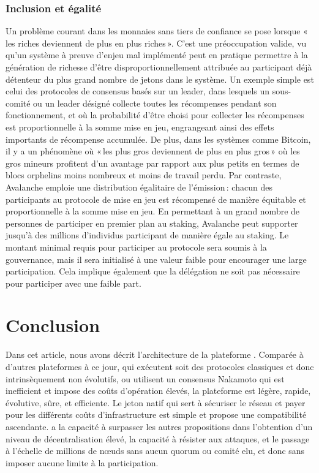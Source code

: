 \documentclass[runningheads,francais,a4paper]{llncs}
\begin{document}
\subsubsection{Inclusion et égalité}
Un problème courant dans les monnaies sans tiers de confiance se pose lorsque «\,les riches deviennent de plus en plus
riches\,». C'est une préoccupation valide, vu qu'un système à preuve d'enjeu mal implémenté peut en pratique permettre à
la génération de richesse d'être disproportionnellement attribuée au participant déjà détenteur du plus grand nombre de
jetons dans le système. Un exemple simple est celui des protocoles de consensus basés sur un leader, dans lesquels un
sous-comité ou un leader désigné collecte toutes les récompenses pendant son fonctionnement, et où la probabilité d'être
choisi pour collecter les récompenses est proportionnelle à la somme mise en jeu, engrangeant ainsi des effets
importants de récompense accumulée. De plus, dans les systèmes comme Bitcoin, il y a un phénomène où «\,les plus gros
deviennent de plus en plus gros\,» où les gros mineurs profitent d'un avantage par rapport aux plus petits en termes
de blocs orphelins moins nombreux et moins de travail perdu. Par contraste, Avalanche emploie une distribution
égalitaire de l'émission\,: chacun des participants au protocole de mise en jeu est récompensé de manière équitable et
proportionnelle à la somme mise en jeu. En permettant à un grand nombre de personnes de participer en premier plan
au staking, Avalanche peut supporter jusqu'à des millions d'individus participant de manière égale au staking. Le
montant minimal requis pour participer au protocole sera soumis à la gouvernance, mais il sera initialisé à une valeur
faible pour encourager une large participation. Cela implique également que la délégation ne soit pas nécessaire pour
participer avec une faible part.

\section{Conclusion}
\label{section:conclusion}
Dans cet article, nous avons décrit l'architecture de la plateforme \AVAPlatformName{}. Comparée à d'autres plateformes à
ce jour, qui exécutent soit des protocoles classiques et donc intrinsèquement non évolutifs, ou utilisent un consensus
Nakamoto qui est inefficient et impose des coûts d'opération élevés, la plateforme \AVAPlatformName{} est légère, rapide,
évolutive, sûre, et efficiente. Le jeton natif qui sert à sécuriser le réseau et payer pour les différents coûts
d'infrastructure est simple et propose une compatibilité ascendante. \AVATokenName{} a la capacité à surpasser les
autres propositions dans l'obtention d'un niveau de décentralisation élevé, la capacité à résister aux attaques, et le
passage à l'échelle de millions de nœuds sans aucun quorum ou comité elu, et donc sans imposer aucune limite à la
participation.
\end{document}
